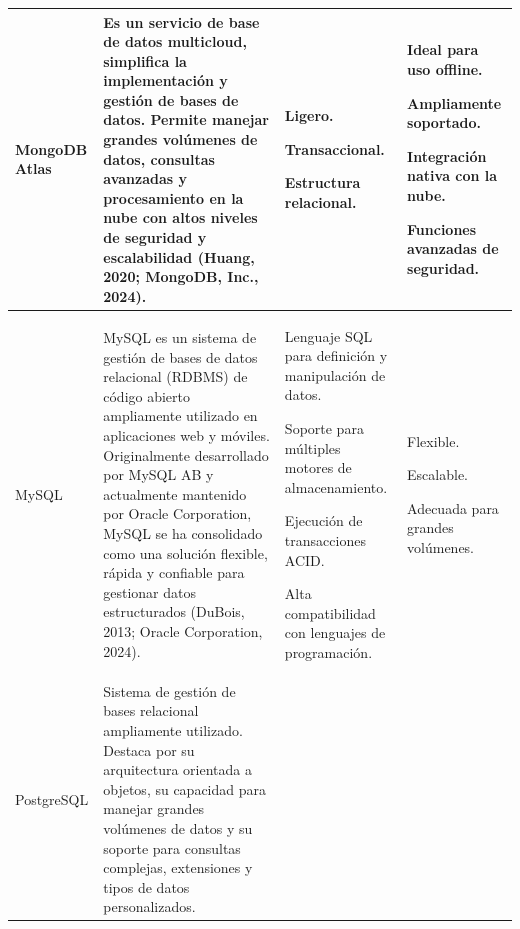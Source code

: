 {\begin{longtable}{|L{2.1cm}|L{5.45cm}|L{3.5cm}|L{3.2cm}|}
\hline
MongoDB Atlas & Es un servicio de base de datos multicloud, simplifica la
implementación y gestión de bases de datos. Permite manejar grandes volúmenes
de datos, consultas avanzadas y procesamiento en la nube con altos niveles de
seguridad y escalabilidad (Huang, 2020; MongoDB, Inc., 2024). &
\begin{tablista}
  \item Ligero.
  \item Transaccional.
  \item Estructura relacional.
\end{tablista} &
\begin{tablista}
  \item Ideal para uso offline.
  \item Ampliamente soportado.
  \item Integración nativa con la nube.
  \item Funciones avanzadas de seguridad.
\end{tablista} \\
\hline
MySQL & MySQL es un sistema de gestión de bases de datos relacional (RDBMS) de
código abierto ampliamente utilizado en aplicaciones web y móviles.
Originalmente desarrollado por MySQL AB y actualmente mantenido por Oracle
Corporation, MySQL se ha consolidado como una solución flexible, rápida y
confiable para gestionar datos estructurados (DuBois, 2013; Oracle Corporation, 2024). &
\begin{tablista}
  \item Lenguaje SQL para definición y manipulación de datos.
  \item Soporte para múltiples motores de almacenamiento.
  \item Ejecución de transacciones ACID.
  \item Alta compatibilidad con lenguajes de programación.
\end{tablista} &
\begin{tablista}
  \item Flexible.
  \item Escalable.
  \item Adecuada para grandes volúmenes.
\end{tablista} \\
\hline
PostgreSQL & Sistema de gestión de bases relacional ampliamente utilizado.
Destaca por su arquitectura orientada a objetos, su capacidad para manejar
grandes volúmenes de datos y su soporte para consultas complejas, extensiones y
tipos de datos personalizados. &
\begin{tablista}

\end{tablista}
\end{longtable}}
